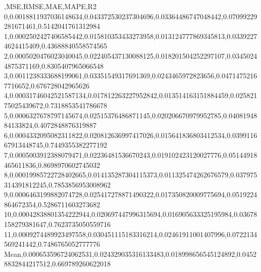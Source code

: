 ,MSE,RMSE,MAE,MAPE,R2
0,0.0018811937036148634,0.043372530237304696,0.03364486747048442,0.07099229281671461,0.5142041761312984
1,0.0002502427406585442,0.015810353433273958,0.013124777869345813,0.03392274624415409,0.43688840558574565
2,0.0005020476023040045,0.022405437130088125,0.018201504252297107,0.03450244875371169,0.8305407965066548
3,0.0011238333688199061,0.03351549317691369,0.0243465972823656,0.04714752167716652,0.676728042965626
4,0.00031746042521587134,0.017812263227952842,0.013514163151884459,0.02582175025439672,0.7318853541786678
5,0.0006327678797145674,0.02515376486871145,0.020206670979952785,0.0408194884133824,0.4072848876319887
6,0.0004332095082311822,0.020812636997417026,0.015641836803412534,0.039911667913448745,0.7449355382277192
7,0.0005003912388079471,0.02236481536670243,0.019102423120027776,0.05144918465611836,0.8698970602745032
8,0.00019985722728402665,0.014135287304115373,0.011325474262676579,0.037975314391812245,0.7853856953008962
9,0.0006463199882074728,0.025417278871490322,0.017350820009775694,0.0519224864672354,0.5286711603273682
10,0.00042838801354222944,0.020697447996315694,0.016905633325195984,0.03678158279381647,0.7623735050559716
11,0.0009274489923497558,0.030451115183316214,0.02461911001407996,0.0722134569241442,0.7486765052777776
Mean,0.000653596724062531,0.024329035316133483,0.018998656545124892,0.04528832844217512,0.669789260622018
